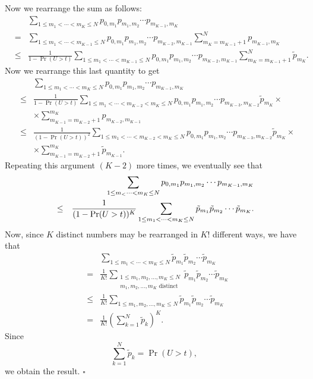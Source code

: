 \documentclass[12pt]{article}
\newcommand{\qed}{\leavevmode\unskip\penalty9999
                  \hbox{}\nobreak\hfill$\square$\goodbreak\medskip}
\begin{document}
Now we rearrange the sum as follows: 
\begin{eqnarray*}
  && \sum_{1 \le m_1 < \cdots < m_{K} \le N}p_{0,m_1} p_{m_1,m_2} 
    \cdots p_{m_{K-1},m_K}\\
  &=& \sum_{1 \le m_1 < \cdots < m_{K-1} \le N}p_{0,m_1} p_{m_1,m_2} 
      \cdots p_{m_{K-2},m_{K-1}} \sum_{m_K = m_{K-1}+1}^Np_{m_{K-1},m_K} \\
  &\le& {\frac{1 }{ 1 - \Pr(U>t)}}\sum_{1 \le m_1 < \cdots < m_{K-1} \le N}
        p_{0,m_1} p_{m_1,m_2} \cdots p_{m_{K-2},m_{K-1}} 
       \sum_{m_K = m_{K-1}+1}^N \tilde p_{m_K} .
\end{eqnarray*} 
Now we rearrange this last quantity to get 
\begin{eqnarray*}
  &&\sum_{1 \le m_1 < \cdots < m_{K} \le N} p_{0,m_1} p_{m_1,m_2} 
    \cdots p_{m_{K-1},m_K}\\
  &\le& {\frac{1 }{ 1 - \Pr(U>t)}}
        \sum_{1 \le m_1 < \cdots < m_{K-2} < m_K\le N} 
        p_{0,m_1} p_{m_1,m_2} \cdots p_{m_{K-3},m_{K-2}} \tilde p_{m_K} \times\\
  && \times
        \sum_{m_{K-1} = m_{K-2}+1}^{m_K} p_{m_{K-2},m_{K-1}} \\ 
  &\le& {\frac{1 }{ (1- \Pr(U>t))^2}}
        \sum_{1 \le m_1 < \cdots < m_{K-2} < m_K\le N}
        p_{0,m_1} p_{m_1,m_2}
        \cdots p_{m_{K-3},m_{K-2}} \tilde p_{m_K} \times\\
  && \times
        \sum_{m_{K-1} = m_{K-2}+1}^{m_K} \tilde p_{m_{K-1}} .
\end{eqnarray*}
Repeating this 
argument $(K-2)$ more times, we eventually see that 
\begin{eqnarray*}
  && \sum_{1 \le m_ < \cdots < m_K \le N} p_{0,m_1} p_{m_1,m_2} \cdots 
     p_{m_{K-1},m_K}\cr 
  &\le& {\frac{1 }{ (1 - \Pr(U>t))^K}}\sum_{1 \le m_1 < \cdots < m_K \le N}
        \tilde p_{m_1} \tilde p_{m_2} \cdots \tilde p_{m_K} .
\end{eqnarray*}
Now, since $K$ distinct numbers may be rearranged in $K!$ different ways,
we have that 
\begin{eqnarray*}
  && \sum_{1 \le m_1 < \cdots < m_K \le N} 
     \tilde p_{m_1} \tilde p_{m_2} \cdots \tilde p_{m_K}\\ 
  &=& {\frac{1 }{ K!}}
      \sum_{\substack{1 \le m_1,m_2,\dots,m_K \le N\\ m_1,m_2,\dots,m_K 
      \text{ distinct}}} \tilde p_{m_1} \tilde p_{m_2} \cdots \tilde
      p_{m_K}\\ 
  &\le& {\frac{1 }{ K!}}
        \sum_{1 \le m_1,m_2,\dots,m_K \le N} \tilde p_{m_1} \tilde p_{m_2}
        \cdots \tilde p_{m_K}\\
  &=& {\frac{1 }{ K!}} \left( \sum_{k=1}^N \tilde p_{k} \right)^K . 
\end{eqnarray*} 
Since $$ \sum_{k=1}^N \tilde p_k= \Pr(U > t),$$ we obtain the
result.
\qed
\end{document}
